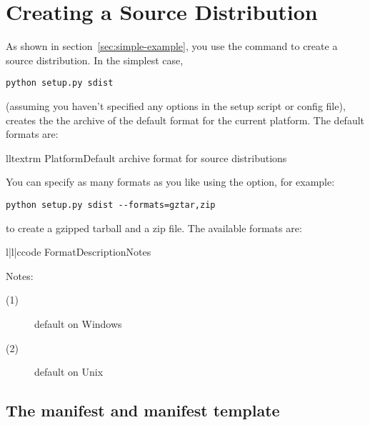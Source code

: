 \documentclass{howto}
\begin{document}


\section{Creating a Source Distribution}
\label{sec:source-dist}

As shown in section~\ref{sec:simple-example}, you use the
 command to create a source distribution.  In the
simplest case,
\begin{verbatim}
python setup.py sdist
\end{verbatim}
(assuming you haven't specified any  options in the setup 
script or config file),  creates the the archive of the
default format for the current platform.  The default formats are:
\begin{tableii}{ll}{textrm}%
  {Platform}{Default archive format for source distributions}
\end{tableii}
You can specify as many formats as you like using the
 option, for example:
\begin{verbatim}
python setup.py sdist --formats=gztar,zip
\end{verbatim}
to create a gzipped tarball and a zip file.  The available formats are:
\begin{tableiii}{l|l|c}{code}%
  {Format}{Description}{Notes}
\end{tableiii}

\noindent Notes:
\begin{description}
\item[(1)] default on Windows
\item[(2)] default on Unix
\end{description}


\subsection{The manifest and manifest template}
\label{sec:manifest}
\end{document}
